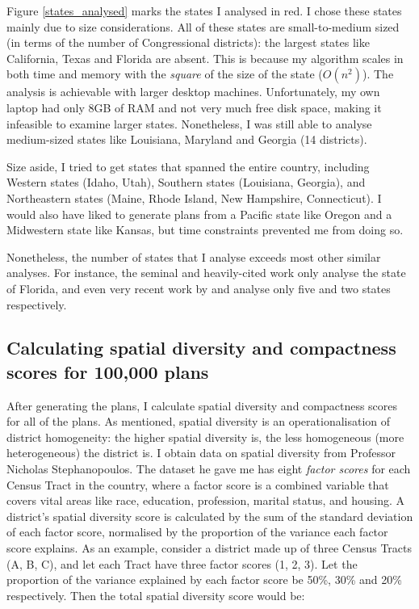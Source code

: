 \documentclass[]{article}
\begin{document}
Figure \ref{states_analysed} marks the states I analysed in red. I chose
these states mainly due to size considerations. All of these states are
small-to-medium sized (in terms of the number of Congressional
districts): the largest states like California, Texas and Florida are
absent. This is because my algorithm scales in both time and memory with
the \emph{square} of the size of the state (\(O(n^2)\)). The analysis is
achievable with larger desktop machines. Unfortunately, my own laptop
had only 8GB of RAM and not very much free disk space, making it
infeasible to examine larger states. Nonetheless, I was still able to
analyse medium-sized states like Louisiana, Maryland and Georgia (14
districts).

Size aside, I tried to get states that spanned the entire country,
including Western states (Idaho, Utah), Southern states (Louisiana,
Georgia), and Northeastern states (Maine, Rhode Island, New Hampshire,
Connecticut). I would also have liked to generate plans from a Pacific
state like Oregon and a Midwestern state like Kansas, but time
constraints prevented me from doing so.

Nonetheless, the number of states that I analyse exceeds most other
similar analyses. For instance, the seminal and heavily-cited work
\cite{cr2013} only analyse the state of Florida, and even very recent
work by \cite{ddj2019recom} and \cite{s2020} analyse only five and two
states respectively.

\hypertarget{calculating-spatial-diversity-and-compactness-scores-for-100000-plans}{%
\subsection{Calculating spatial diversity and compactness scores for
100,000
plans}\label{calculating-spatial-diversity-and-compactness-scores-for-100000-plans}}

After generating the plans, I calculate spatial diversity and
compactness scores for all of the plans. As mentioned, spatial diversity
is an operationalisation of district homogeneity: the higher spatial
diversity is, the less homogeneous (more heterogeneous) the district is.
I obtain data on spatial diversity from Professor Nicholas
Stephanopoulos. The dataset he gave me has eight \emph{factor scores}
for each Census Tract in the country, where a factor score is a combined
variable that covers vital areas like race, education, profession,
marital status, and housing. A district's spatial diversity score is
calculated by the sum of the standard deviation of each factor score,
normalised by the proportion of the variance each factor score explains.
As an example, consider a district made up of three Census Tracts (A, B,
C), and let each Tract have three factor scores (1, 2, 3). Let the
proportion of the variance explained by each factor score be 50\%, 30\%
and 20\% respectively. Then the total spatial diversity score would be:
\end{document}

